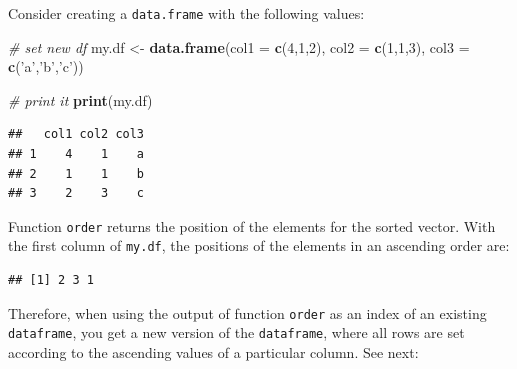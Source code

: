 \documentclass[11pt,]{book}
\newenvironment{Shaded}{\begin{snugshade}}{\end{snugshade}}
\newcommand{\KeywordTok}[1]{\textcolor[rgb]{0.27,0.27,0.27}{\textbf{#1}}}
\newcommand{\DataTypeTok}[1]{\textcolor[rgb]{0.27,0.27,0.27}{#1}}
\newcommand{\DecValTok}[1]{\textcolor[rgb]{0.06,0.06,0.06}{#1}}
\newcommand{\StringTok}[1]{\textcolor[rgb]{0.5,0.5,0.5}{#1}}
\newcommand{\CommentTok}[1]{\textcolor[rgb]{0.56,0.35,0.01}{\textit{#1}}}
\newcommand{\OperatorTok}[1]{\textcolor[rgb]{0.81,0.36,0.00}{\textbf{#1}}}
\newcommand{\NormalTok}[1]{#1}
\begin{document}
Consider creating a \texttt{data.frame} with the following values:

\begin{Shaded}
\begin{Highlighting}[]
\CommentTok{# set new df}
\NormalTok{my.df <-}\StringTok{ }\KeywordTok{data.frame}\NormalTok{(}\DataTypeTok{col1 =} \KeywordTok{c}\NormalTok{(}\DecValTok{4}\NormalTok{,}\DecValTok{1}\NormalTok{,}\DecValTok{2}\NormalTok{), }
                    \DataTypeTok{col2 =} \KeywordTok{c}\NormalTok{(}\DecValTok{1}\NormalTok{,}\DecValTok{1}\NormalTok{,}\DecValTok{3}\NormalTok{), }
                    \DataTypeTok{col3 =} \KeywordTok{c}\NormalTok{(}\StringTok{'a'}\NormalTok{,}\StringTok{'b'}\NormalTok{,}\StringTok{'c'}\NormalTok{))}

\CommentTok{# print it                  }
\KeywordTok{print}\NormalTok{(my.df)}
\end{Highlighting}
\end{Shaded}

\begin{verbatim}
##   col1 col2 col3
## 1    4    1    a
## 2    1    1    b
## 3    2    3    c
\end{verbatim}

Function \texttt{order} returns the position of the elements for the
sorted vector. With the first column of \texttt{my.df}, the positions of
the elements in an ascending order are:

\begin{Shaded}
\end{Shaded}

\begin{verbatim}
## [1] 2 3 1
\end{verbatim}

Therefore, when using the output of function \texttt{order} as an index
of an existing \texttt{dataframe}, you get a new version of the
\texttt{dataframe}, where all rows are set according to the ascending
values of a particular column. See next:

\begin{Shaded}
\end{Shaded}
\end{document}
